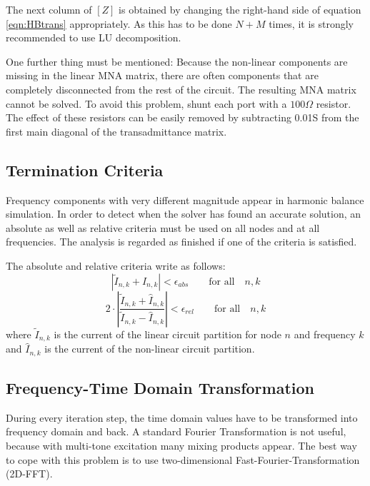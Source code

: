 \addvspace{12pt}

The next column of $[Z]$ is obtained by changing the right-hand
side of equation \eqref{eqn:HBtrans} appropriately. As this has to
be done $N+M$ times, it is strongly recommended to use LU
decomposition.

\addvspace{12pt}

One further thing must be mentioned: Because the non-linear
components are missing in the linear MNA matrix, there are often
components that are completely disconnected from the rest of the
circuit. The resulting MNA matrix cannot be solved. To avoid
this problem, shunt each port with a $100\Omega$ resistor. The
effect of these resistors can be easily removed by subtracting
0.01S from the first main diagonal of the transadmittance matrix.


\subsection{Termination Criteria}

Frequency components with very different magnitude appear in harmonic
balance simulation. In order to detect when the solver has found an
accurate solution, an absolute as well as relative criteria must be
used on all nodes and at all frequencies. The analysis is regarded as
finished if one of the criteria is satisfied.

\addvspace{12pt}

The absolute and relative criteria write as follows:
\begin{equation}
\left| \tilde{I}_{n,k} + \hat{I}_{n,k} \right| < \epsilon_{abs}
  \qquad \text{for all} \quad n, k
\end{equation}
\begin{equation}
2\cdot \left| \frac{\tilde{I}_{n,k} + \hat{I}_{n,k}}
                   {\tilde{I}_{n,k} - \hat{I}_{n,k}} \right|
  < \epsilon_{rel}  \qquad \text{for all} \quad n, k
\end{equation}
where $\tilde{I}_{n,k}$ is the current of the linear circuit
partition for node $n$ and frequency $k$ and $\hat{I}_{n,k}$
is the current of the non-linear circuit partition.

\subsection{Frequency-Time Domain Transformation}

During every iteration step, the time domain values have to be transformed
into frequency domain and back. A standard Fourier Transformation is not
useful, because with multi-tone excitation many mixing products appear.
The best way to cope with this problem is to use two-dimensional
Fast-Fourier-Transformation (2D-FFT).
